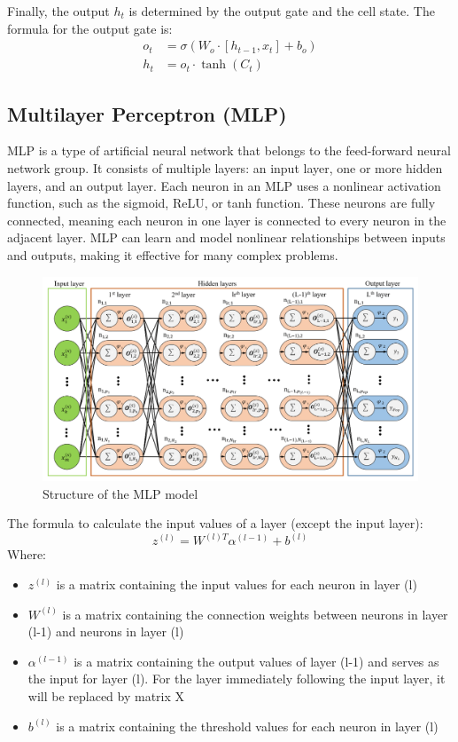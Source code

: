 \documentclass{ieeeojies}
\begin{document}
Finally, the output \( h_t \) is determined by the output gate and the cell state. The formula for the output gate is:
\begin{align*}
    o_t & = \sigma(W_o \cdot [h_{t-1}, x_t] + b_o) \\
    h_t & = o_t \cdot \tanh(C_t)
\end{align*}

\subsection{Multilayer Perceptron (MLP)}
MLP is a type of artificial neural network that belongs to the feed-forward neural network group. It consists of multiple layers: an input layer, one or more hidden layers, and an output layer. Each neuron in an MLP uses a nonlinear activation function, such as the sigmoid, ReLU, or tanh function. These neurons are fully connected, meaning each neuron in one layer is connected to every neuron in the adjacent layer. MLP can learn and model nonlinear relationships between inputs and outputs, making it effective for many complex problems. \cite{mlp}
\begin{figure}[H]
  \centering
  \begin{minipage}{0.8\linewidth}
    \centering
    \includegraphics[width=\linewidth]{Figure_algorithm/mlp.png}
    \caption{Structure of the MLP model \cite{mlp_image}}
    \label{fig_mlp}
  \end{minipage}
\end{figure}
The formula to calculate the input values of a layer (except the input layer):
\[ z^{(l)} = W^{(l) T}\alpha^{(l-1)} + b^{(l)} \]
Where:
    \begin{itemize}
        \item $z^{(l)}$ is a matrix containing the input values for each neuron in layer (l)
        \item $W^{(l)}$ is a matrix containing the connection weights between neurons in layer (l-1) and neurons in layer (l)
        \item $\alpha^{(l-1)}$ is a matrix containing the output values of layer (l-1) and serves as the input for layer (l). For the layer immediately following the input layer, it will be replaced by matrix X
        \item $b^{(l)}$ is a matrix containing the threshold values for each neuron in layer (l)
    \end{itemize}
        
\end{document}
